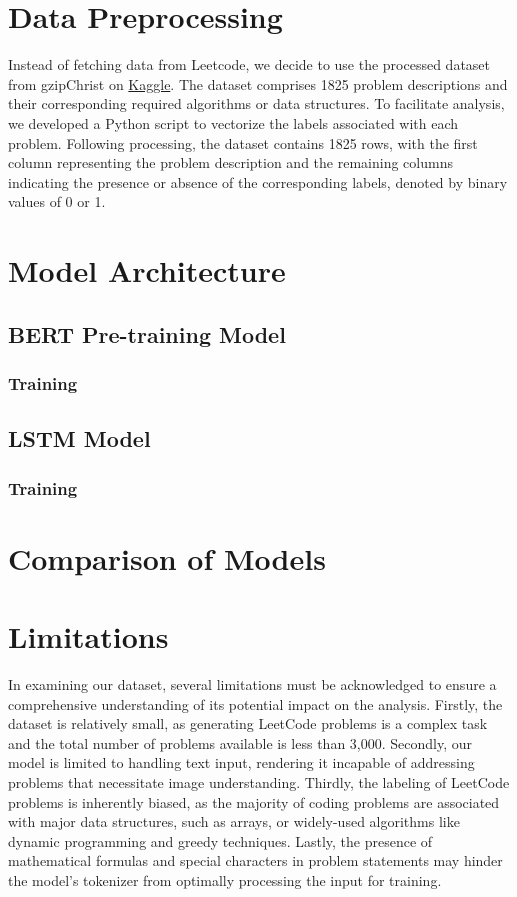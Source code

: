 \documentclass{article}
\begin{document}
\section{Data Preprocessing}
Instead of fetching data from Leetcode, we decide to use the processed dataset from gzipChrist\cite{DATA} on \href{https://www.kaggle.com/}{Kaggle}. The dataset comprises 1825 problem descriptions and their corresponding required algorithms or data structures. To facilitate analysis, we developed a Python script to vectorize the labels associated with each problem. Following processing, the dataset contains 1825 rows, with the first column representing the problem description and the remaining columns indicating the presence or absence of the corresponding labels, denoted by binary values of 0 or 1.
\section{Model Architecture}

\subsection{BERT Pre-training Model}

\subsubsection{Training}

\subsection{LSTM Model}

\subsubsection{Training}

\section{Comparison of Models}

\section{Limitations}
In examining our dataset, several limitations must be acknowledged to ensure a comprehensive understanding of its potential impact on the analysis. Firstly, the dataset is relatively small, as generating LeetCode problems is a complex task and the total number of problems available is less than 3,000. Secondly, our model is limited to handling text input, rendering it incapable of addressing problems that necessitate image understanding. Thirdly, the labeling of LeetCode problems is inherently biased, as the majority of coding problems are associated with major data structures, such as arrays, or widely-used algorithms like dynamic programming and greedy techniques. Lastly, the presence of mathematical formulas and special characters in problem statements may hinder the model’s tokenizer from optimally processing the input for training.
\end{document}
